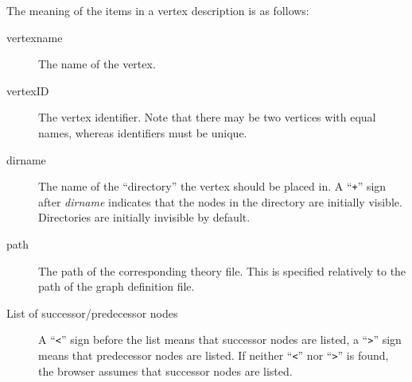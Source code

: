 The meaning of the items in a vertex description is as follows:
\begin{description}
  
\item[vertexname] The name of the vertex.
  
\item[vertexID] The vertex identifier. Note that there may be two
  vertices with equal names, whereas identifiers must be unique.
  
\item[dirname] The name of the ``directory'' the vertex should be
  placed in.  A ``{\tt +}'' sign after {\it dirname} indicates that
  the nodes in the directory are initially visible. Directories are
  initially invisible by default.
  
\item[path] The path of the corresponding theory file. This is
  specified relatively to the path of the graph definition file.
  
\item[List of successor/predecessor nodes] A ``{\tt <}'' sign before
  the list means that successor nodes are listed, a ``{\tt >}'' sign
  means that predecessor nodes are listed. If neither ``{\tt <}'' nor
  ``{\tt >}'' is found, the browser assumes that successor nodes are
  listed.

\end{description}


